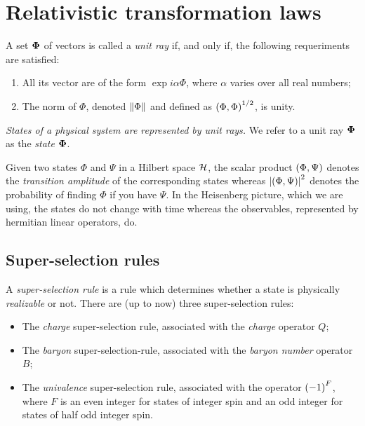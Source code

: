 \documentclass[oneside, 12pt, notitlepage]{book}
\begin{document}
\frontmatter
{}

\contents
\mainmatter

\chapter{Relativistic transformation laws}

A set \(\bPhi\) of vectors is called a \emph{unit ray} if, and only if, the following requeriments are satisfied:
\begin{enumerate}
	\item All its vector are of the form \(\exp{i\alpha} \Phi\), where \(\alpha\) varies over all real numbers;
	\item The norm of \(\Phi\), denoted \(\norm{\Phi}\) and defined as \(\sp{\Phi}{\Phi}^{1/2}\), is unity.
\end{enumerate}
\emph{States of a physical system are represented by unit rays.} We refer to a unit ray \(\bPhi\) as the \emph{state} \(\bPhi\).\par

Given two states \(\Phi\) and \(\Psi\) in a Hilbert space \(\mc{H}\), the scalar product \(\sp{\Phi}{\Psi}\) denotes the \emph{transition amplitude} of the corresponding states whereas \(\abs{\sp{\Phi}{\Psi}}^2\) denotes the probability of finding \(\Phi\) if you have \(\Psi\). In the Heisenberg picture, which we are using, the states do not change with time whereas the observables, represented by hermitian linear operators, do.\par

\section{Super-selection rules}

A \emph{super-selection rule} is a rule which determines whether a state is physically \emph{realizable} or not. There are (up to now) three super-selection rules:
\begin{itemize}
	\item The \emph{charge} super-selection rule, associated with the \emph{charge} operator \(Q\);
	\item The \emph{baryon} super-selection-rule, associated with the \emph{baryon number} operator \(B\);
	\item The \emph{univalence} super-selection rule, associated with the operator \(\lr{-1}^F\), where \(F\) is an even integer for states of integer spin and an odd integer for states of half odd integer spin.
\end{itemize}\par
\end{document}
